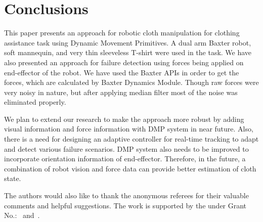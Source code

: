 \documentclass[sigconf]{acmart}
\begin{document}
\section{Conclusions}
\label{sec:conclusions}
This paper presents an approach for robotic cloth manipulation for clothing assistance task using Dynamic Movement Primitives. A dual arm Baxter robot, soft mannequin, and very thin sleeveless T-shirt were used in the task. We have also presented an approach for failure detection using forces being applied on end-effector of the robot. We have used the Baxter APIs in order to get the forces, which are calculated by Baxter Dynamics Module. Though raw forces were very noisy in nature, but after applying median filter most of the noise was eliminated properly.

We plan to extend our research to make the approach more robust by adding visual information and force information with DMP system in near future. Also, there is a need for designing an adaptive controller for real-time tracking to adapt and detect various failure scenarios. DMP system also needs to be improved to incorporate orientation information of end-effector. Therefore, in the future, a combination of robot vision and force data can provide better estimation of cloth state.

\begin{acks}
	The authors would also like to thank the anonymous referees for their valuable comments and helpful suggestions. The work is supported by the  under Grant No.:~ and~.
\end{acks}


%

\end{document}
